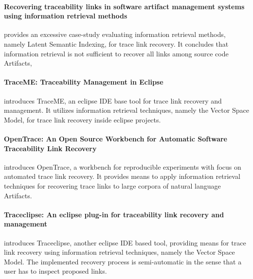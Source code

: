 \paragraph*{Recovering traceability links in software artifact management systems using information retrieval methods}
\cite{Lucia:2007:RTL:1276933.1276934}
provides an excessive case-study evaluating information retrieval methods, namely Latent Semantic Indexing, for trace link recovery.
It concludes that information retrieval is not sufficient to recover all links among source code \glspl{Artifact}, 

\paragraph*{TraceME: Traceability Management in Eclipse}
\cite{TraceME}
introduces TraceME, an eclipse \gls{IDE} base tool for trace link recovery and management.
It utilizes information retrieval techniques, namely the Vector Space Model, for trace link recovery inside eclipse projects.

\paragraph*{OpenTrace: An Open Source Workbench for Automatic Software Traceability Link Recovery}
\cite{OpenTrace}
introduces OpenTrace, a workbench for reproducible experiments with focus on automated trace link recovery.
It provides means to apply information retrieval techniques for recovering trace links to large corpora of natural language \glspl{Artifact}.

\paragraph*{Traceclipse: An eclipse plug-in for traceability link recovery and management}
\cite{Traceclipse}
introduces Traceclipse, another eclipse \gls{IDE} based tool, providing means for trace link recovery using information retrieval techniques, namely the Vector Space Model.
The implemented recovery process is semi-automatic in the sense that a user has to inspect proposed links.

